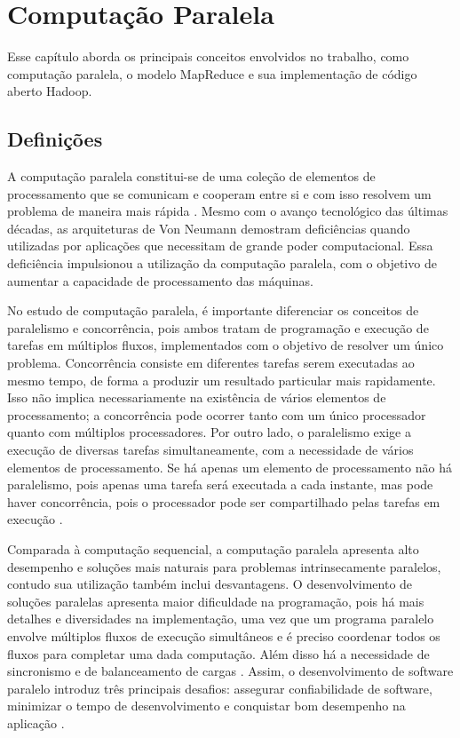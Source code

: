 \chapter{Computação Paralela}
\label{cap:referencial}

Esse capítulo aborda os principais conceitos envolvidos no trabalho,  como computação paralela, o modelo MapReduce e sua implementação de código aberto Hadoop.


\section{Definições}

A computação paralela constitui-se de uma coleção de elementos de processamento que se comunicam e cooperam entre si e com isso resolvem um problema de maneira mais rápida \cite{Almasi:1994}. Mesmo com o avanço tecnológico das últimas décadas, as arquiteturas de Von Neumann demostram deficiências quando utilizadas por aplicações que necessitam de grande poder computacional. Essa deficiência impulsionou a utilização da computação paralela, com o objetivo de aumentar a capacidade de processamento das máquinas.

No estudo de computação paralela, é importante diferenciar os conceitos de paralelismo e concorrência, pois ambos tratam de programação e execução de tarefas em múltiplos fluxos, implementados com o objetivo de resolver um único problema. Concorrência consiste em diferentes tarefas serem executadas ao mesmo tempo, de forma a produzir um resultado particular mais rapidamente. Isso não implica necessariamente na existência de vários elementos de processamento; a concorrência pode ocorrer tanto com um único processador quanto com múltiplos processadores. 
Por outro lado, o paralelismo exige a execução de diversas tarefas simultaneamente, com a necessidade de vários elementos de processamento. 
Se há apenas um elemento de processamento não há paralelismo, pois apenas uma tarefa será executada a cada instante, mas pode haver concorrência, pois o processador pode ser compartilhado pelas tarefas em execução \cite{Breshears:2009}.

Comparada à computação sequencial, a computação paralela apresenta alto desempenho e soluções mais naturais para problemas intrinsecamente paralelos, contudo sua utilização também inclui desvantagens. O desenvolvimento de soluções paralelas apresenta maior dificuldade na programação, pois há mais detalhes e diversidades na implementação, uma vez que um programa paralelo envolve múltiplos fluxos de execução simultâneos e é preciso coordenar todos os fluxos para completar uma dada computação. Além disso há a necessidade de sincronismo e de balanceamento de cargas \cite{Rauber:2010}. 	Assim, o desenvolvimento de software paralelo introduz três principais desafios: assegurar confiabilidade de software, minimizar o tempo de desenvolvimento e conquistar bom desempenho na aplicação \cite{Leiserson:2008}.

